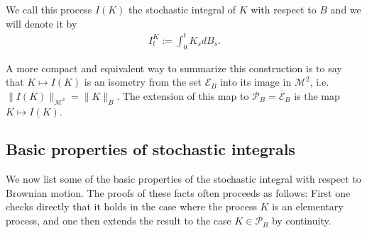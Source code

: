 \documentclass[../mainfile.tex]{subfiles}
\begin{document}
\begin{defn} We call this process $I(K)$ the stochastic integral of $K$ with respect to $B$ and we will denote it by
\begin{align*}
I_t^K := \int_0^t K_sdB_s.
\end{align*}
\end{defn}
\begin{rem} A more compact and equivalent way to summarize this construction is to say that $K \mapsto I(K)$ is an isometry from the set $\mathcal{E}_B$ into its image in $\mathcal{M}^2$, i.e. $\|I(K)\|_{\mathcal{M}^2} = \| K\|_B$. The extension of this map to $\mathcal{P}_B= \overline{\mathcal{E}}_B$ is the map $K \mapsto I(K)$. 
\end{rem}
\newpage
\subsection{Basic properties of stochastic integrals}
We now list some of the basic properties of the stochastic integral with respect to Brownian motion. The proofs of these facts often proceeds as follows: First one checks directly that it holds in the case where the process $K$ is an elementary process, and one then extends the result to the case $K \in \mathcal{P}_B$ by continuity. 
\end{document}

